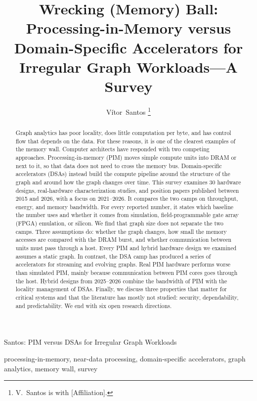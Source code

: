 \documentclass[journal,onecolumn]{IEEEtran}
\begin{document}
\title{Wrecking (Memory) Ball: Processing-in-Memory versus Domain-Specific Accelerators for Irregular Graph Workloads---A Survey}

\author{Vítor~Santos%
\thanks{V.~Santos is with [Affiliation].}}

%
{Santos: PIM versus DSAs for Irregular Graph Workloads}

\maketitle

\begin{abstract}
Graph analytics has poor locality, does little computation per byte, and has control flow that depends on the data. For these reasons, it is one of the clearest examples of the memory wall. Computer architects have responded with two competing approaches. Processing-in-memory (PIM) moves simple compute units into DRAM or next to it, so that data does not need to cross the memory bus. Domain-specific accelerators (DSAs) instead build the compute pipeline around the structure of the graph and around how the graph changes over time. This survey examines 30 hardware designs, real-hardware characterization studies, and position papers published between 2015 and 2026, with a focus on 2021--2026. It compares the two camps on throughput, energy, and memory bandwidth. For every reported number, it states which baseline the number uses and whether it comes from simulation, field-programmable gate array (FPGA) emulation, or silicon. We find that graph size does not separate the two camps. Three assumptions do: whether the graph changes, how small the memory accesses are compared with the DRAM burst, and whether communication between units must pass through a host. Every PIM and hybrid hardware design we examined assumes a static graph. In contrast, the DSA camp has produced a series of accelerators for streaming and evolving graphs. Real PIM hardware performs worse than simulated PIM, mainly because communication between PIM cores goes through the host. Hybrid designs from 2025--2026 combine the bandwidth of PIM with the locality management of DSAs. Finally, we discuss three properties that matter for critical systems and that the literature has mostly not studied: security, dependability, and predictability. We end with six open research directions.
\end{abstract}

\begin{IEEEkeywords}
processing-in-memory, near-data processing, domain-specific accelerators, graph analytics, memory wall, survey
\end{IEEEkeywords}
\end{document}
